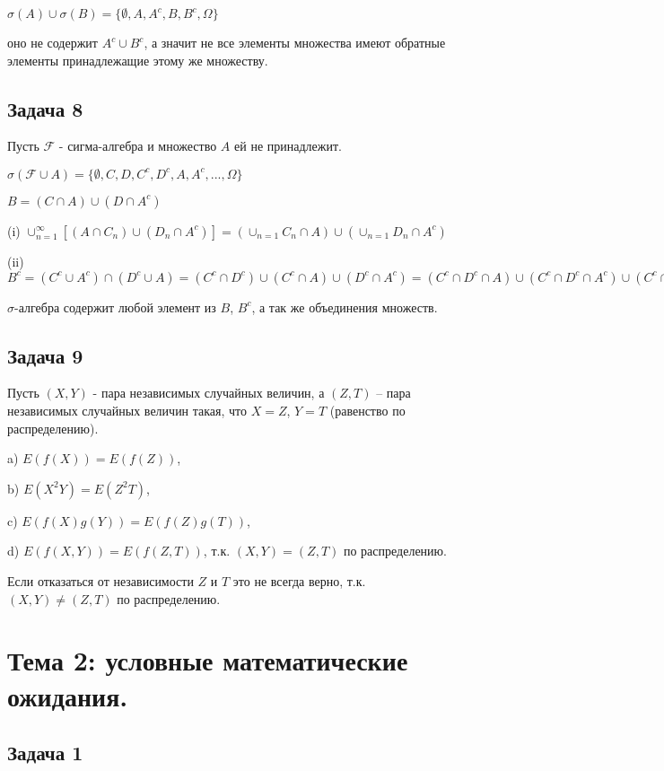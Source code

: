\documentclass[a4paper,12pt]{article} %
\begin{document}
$\sigma(A) \cup \sigma(B) = \{\emptyset, A, A^c, B, B^c,  \Omega  \}$

оно не содержит $A^c \cup B^c$,  а значит не все элементы множества  имеют обратные элементы принадлежащие этому же множеству.

\subsection*{Задача 8}

Пусть $\mathcal{F}$ - сигма-алгебра и множество $A$ ей не принадлежит. 


$\sigma(\mathcal{F} \cup A) = \{\emptyset, C, D, C^c, D^c, A, A^c, ...,  \Omega \} $

$B = (C \cap A) \cup (D \cap A^c) $

(i) $\cup_{n=1}^{\infty} [(A \cap C_n) \cup  (D_n \cap A^c)] = (\cup_{n=1} C_n \cap A)  \cup   (\cup_{n=1} D_n \cap A^c)  $

(ii) $B^c = (C^c \cup A^c) \cap (D^c \cup A) = (C^c \cap D^c) \cup  (C^c \cap A) \cup (D^c \cap A^c) =  (C^c \cap D^c \cap A ) \cup  (C^c \cap D^c \cap A^c ) \cup (C^c \cap A) \cup (D^c \cap A^c)  =  (C^c \cap A) \cup (D^c \cap A^c)$

$\sigma$-алгебра содержит любой элемент из $B$, $B^c$, а так же объединения множеств. 

\subsection*{Задача 9}

Пусть $(X, Y)$ - пара независимых случайных величин, а $(Z, T)$ – пара независимых
случайных величин такая, что $X = Z$, $Y = T$ (равенство по распределению).

a) $E(f(X)) = E(f(Z))$, 

b) $E(X^2Y) = E(Z^2T)$, 

c) $E(f(X)g(Y))=E(f(Z)g(T))$, 

d) $E(f(X, Y))=E(f(Z, T))$, т.к. $(X,Y)=(Z,T)$ по распределению.

Если отказаться от независимости $Z$ и $T$ это не всегда верно, т.к. $(X,Y) \neq (Z,T)$ по распределению.

\section*{Тема 2: условные математические ожидания.}

\subsection*{Задача 1}
\end{document}
